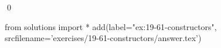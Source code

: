 
\begin{ex}
  \label{ex:19-61-constructors}
  
  \qed
\end{ex}
\begin{python0}
from solutions import *
add(label="ex:19-61-constructors",
    srcfilename='exercises/19-61-constructors/answer.tex')
\end{python0}
